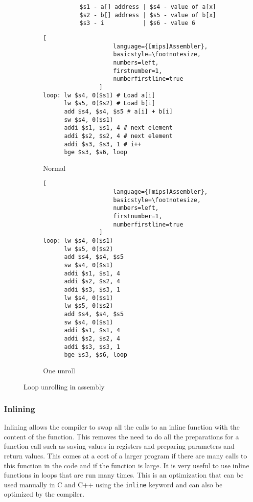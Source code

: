\begin{figure}
    \centering
    \begin{adjustbox}{minipage=\linewidth,scale=0.8}
        \begin{verbatim}
                $s1 - a[] address | $s4 - value of a[x]
                $s2 - b[] address | $s5 - value of b[x]
                $s3 - i           | $s6 - value 6
        \end{verbatim}
        \begin{subfigure}{.55\textwidth}
            \centering
            \begin{lstlisting}[
                    language={[mips]Assembler},
                    basicstyle=\footnotesize,
                    numbers=left,
                    firstnumber=1,
                    numberfirstline=true
                ]
loop: lw $s4, 0($s1) # Load a[i]
      lw $s5, 0($s2) # Load b[i]
      add $s4, $s4, $s5 # a[i] + b[i]
      sw $s4, 0($s1)
      addi $s1, $s1, 4 # next element
      addi $s2, $s2, 4 # next element
      addi $s3, $s3, 1 # i++
      bge $s3, $s6, loop
                \end{lstlisting}
            \caption{Normal}
            \label{fig:unroll:sub1}
        \end{subfigure}%
        \begin{subfigure}{.3\textwidth}
            \centering
            \begin{lstlisting}[
                    language={[mips]Assembler},
                    basicstyle=\footnotesize,
                    numbers=left,
                    firstnumber=1,
                    numberfirstline=true
                ]
loop: lw $s4, 0($s1)
      lw $s5, 0($s2)
      add $s4, $s4, $s5
      sw $s4, 0($s1)
      addi $s1, $s1, 4
      addi $s2, $s2, 4
      addi $s3, $s3, 1
      lw $s4, 0($s1)
      lw $s5, 0($s2)
      add $s4, $s4, $s5
      sw $s4, 0($s1)
      addi $s1, $s1, 4
      addi $s2, $s2, 4
      addi $s3, $s3, 1
      bge $s3, $s6, loop
                \end{lstlisting}
            \caption{One unroll}
            \label{fig:unroll:sub2}
        \end{subfigure}
    \end{adjustbox}
    \caption{Loop unrolling in assembly}
    \label{fig:assembly:unroll}
\end{figure}


\subsubsection{Inlining}
Inlining allows the compiler to swap all the calls to an inline function with the content of the function. This removes the need to do all the preparations for a function call such as saving values in registers and preparing parameters and return values. This comes at a cost of a larger program if there are many calls to this function in the code and if the function is large. It is very useful to use inline functions in loops that are run many times. This is an optimization that can be used manually in C and C++ using the \texttt{inline} keyword and can also be optimized by the compiler.


